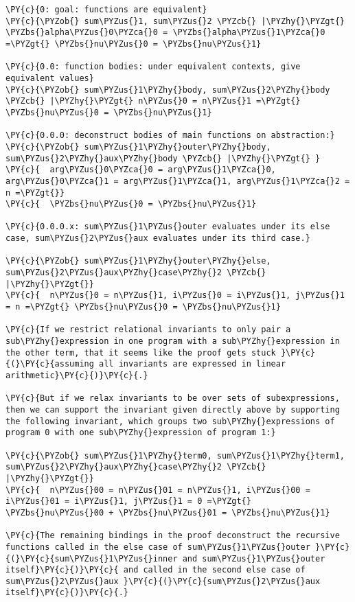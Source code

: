 \begin{Verbatim}[commandchars=\\\{\},codes={\catcode`\$=3\catcode`\^=7\catcode`\_=8}]
\PY{c}{0: goal: functions are equivalent}
\PY{c}{\PYZob{} sum\PYZus{}1, sum\PYZus{}2 \PYZcb{} |\PYZhy{}\PYZgt{} \PYZbs{}alpha\PYZus{}0\PYZca{}0 = \PYZbs{}alpha\PYZus{}1\PYZca{}0 =\PYZgt{} \PYZbs{}nu\PYZus{}0 = \PYZbs{}nu\PYZus{}1}

\PY{c}{0.0: function bodies: under equivalent contexts, give equivalent values}
\PY{c}{\PYZob{} sum\PYZus{}1\PYZhy{}body, sum\PYZus{}2\PYZhy{}body \PYZcb{} |\PYZhy{}\PYZgt{} n\PYZus{}0 = n\PYZus{}1 =\PYZgt{} \PYZbs{}nu\PYZus{}0 = \PYZbs{}nu\PYZus{}1}

\PY{c}{0.0.0: deconstruct bodies of main functions on abstraction:}
\PY{c}{\PYZob{} sum\PYZus{}1\PYZhy{}outer\PYZhy{}body, sum\PYZus{}2\PYZhy{}aux\PYZhy{}body \PYZcb{} |\PYZhy{}\PYZgt{} }
\PY{c}{  arg\PYZus{}0\PYZca{}0 = arg\PYZus{}1\PYZca{}0, arg\PYZus{}0\PYZca{}1 = arg\PYZus{}1\PYZca{}1, arg\PYZus{}1\PYZca{}2 = n =\PYZgt{}}
\PY{c}{  \PYZbs{}nu\PYZus{}0 = \PYZbs{}nu\PYZus{}1}

\PY{c}{0.0.0.x: sum\PYZus{}1\PYZus{}outer evaluates under its else case, sum\PYZus{}2\PYZus{}aux evaluates under its third case.}

\PY{c}{\PYZob{} sum\PYZus{}1\PYZhy{}outer\PYZhy{}else, sum\PYZus{}2\PYZus{}aux\PYZhy{}case\PYZhy{}2 \PYZcb{} |\PYZhy{}\PYZgt{}}
\PY{c}{  n\PYZus{}0 = n\PYZus{}1, i\PYZus{}0 = i\PYZus{}1, j\PYZus{}1 = n =\PYZgt{} \PYZbs{}nu\PYZus{}0 = \PYZbs{}nu\PYZus{}1}

\PY{c}{If we restrict relational invariants to only pair a sub\PYZhy{}expression in one program with a sub\PYZhy{}expression in the other term, that it seems like the proof gets stuck }\PY{c}{(}\PY{c}{assuming all invariants are expressed in linear arithmetic}\PY{c}{)}\PY{c}{.}

\PY{c}{But if we relax invariants to be over sets of subexpressions, then we can support the invariant given directly above by supporting the following invariant, which groups two sub\PYZhy{}expressions of program 0 with one sub\PYZhy{}expression of program 1:}

\PY{c}{\PYZob{} sum\PYZus{}1\PYZhy{}term0, sum\PYZus{}1\PYZhy{}term1, sum\PYZus{}2\PYZhy{}aux\PYZhy{}case\PYZhy{}2 \PYZcb{} |\PYZhy{}\PYZgt{}}
\PY{c}{  n\PYZus{}00 = n\PYZus{}01 = n\PYZus{}1, i\PYZus{}00 = i\PYZus{}01 = i\PYZus{}1, j\PYZus{}1 = 0 =\PYZgt{} \PYZbs{}nu\PYZus{}00 + \PYZbs{}nu\PYZus{}01 = \PYZbs{}nu\PYZus{}1}

\PY{c}{The remaining bindings in the proof deconstruct the recursive functions called in the else case of sum\PYZus{}1\PYZus{}outer }\PY{c}{(}\PY{c}{sum\PYZus{}1\PYZus{}inner and sum\PYZus{}1\PYZus{}outer itself}\PY{c}{)}\PY{c}{ and called in the second else case of sum\PYZus{}2\PYZus{}aux }\PY{c}{(}\PY{c}{sum\PYZus{}2\PYZus{}aux itself}\PY{c}{)}\PY{c}{.}


\end{Verbatim}
